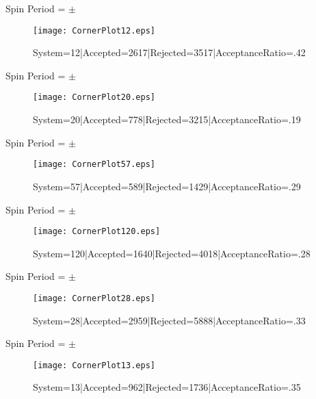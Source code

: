 \documentclass[10pt]{article}
\begin{document}
\begin{center}
        Spin Period = $\pm$ 
\begin{figure}[h] 
        \texttt{[image: CornerPlot12.eps]}
        \caption{System=12|Accepted=2617|Rejected=3517|AcceptanceRatio=.42}
        \label{S12}
        \centering
        \end{figure}
        \end{center}
\begin{center}
        Spin Period = $\pm$ 
\begin{figure}[h] 
        \texttt{[image: CornerPlot20.eps]}
        \caption{System=20|Accepted=778|Rejected=3215|AcceptanceRatio=.19}
        \label{S20}
        \centering
        \end{figure}
        \end{center}
\begin{center}
        Spin Period = $\pm$ 
\begin{figure}[h] 
        \texttt{[image: CornerPlot57.eps]}
        \caption{System=57|Accepted=589|Rejected=1429|AcceptanceRatio=.29}
        \label{S57}
        \centering
        \end{figure}
        \end{center}
\begin{center}
        Spin Period = $\pm$ 
\begin{figure}[h] 
        \texttt{[image: CornerPlot120.eps]}
        \caption{System=120|Accepted=1640|Rejected=4018|AcceptanceRatio=.28}
        \label{S120}
        \centering
        \end{figure}
        \end{center}
\begin{center}
        Spin Period = $\pm$ 
\begin{figure}[h] 
        \texttt{[image: CornerPlot28.eps]}
        \caption{System=28|Accepted=2959|Rejected=5888|AcceptanceRatio=.33}
        \label{S28}
        \centering
        \end{figure}
        \end{center}
\begin{center}
        Spin Period = $\pm$ 
\begin{figure}[h] 
        \texttt{[image: CornerPlot13.eps]}
        \caption{System=13|Accepted=962|Rejected=1736|AcceptanceRatio=.35}
        \label{S13}
        \centering
        \end{figure}
        \end{center}
\end{document}
